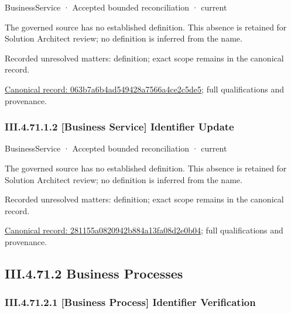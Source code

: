 \label{element:063b7a6b4ad549428a7566a4ce2c5de5}
{\small BusinessService · Accepted bounded reconciliation · current}\par

The governed source has no established definition. This absence is retained for Solution Architect review; no definition is inferred from the name.


{\small Recorded unresolved matters: definition; exact scope remains in the canonical record.}\par
{\footnotesize \href{../../../../continuum/business/business-service/063b7a6b4ad549428a7566a4ce2c5de5.md}{Canonical record: 063b7a6b4ad549428a7566a4ce2c5de5}; full qualifications and provenance.}\par
\subsubsection*{III.4.71.1.2 [Business Service] Identifier Update}
\label{navigation:III.4.71.1.2}

\label{element:281155a0820942b884a13fa08d2e0b04}
{\small BusinessService · Accepted bounded reconciliation · current}\par

The governed source has no established definition. This absence is retained for Solution Architect review; no definition is inferred from the name.


{\small Recorded unresolved matters: definition; exact scope remains in the canonical record.}\par
{\footnotesize \href{../../../../continuum/business/business-service/281155a0820942b884a13fa08d2e0b04.md}{Canonical record: 281155a0820942b884a13fa08d2e0b04}; full qualifications and provenance.}\par
\subsection*{III.4.71.2 Business Processes}
\label{navigation:III.4.71.2}

\subsubsection*{III.4.71.2.1 [Business Process] Identifier Verification}
\label{navigation:III.4.71.2.1}

